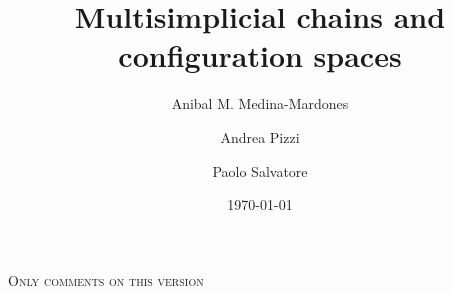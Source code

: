 \documentclass{amsart}
\title[Multisimplicial chains and configuration spaces]{Multisimplicial chains and configuration spaces}
\author[Medina-Mardones]{Anibal M. Medina-Mardones}
\author[Pizzi]{Andrea Pizzi}
\author[Salvatore]{Paolo Salvatore}
\date{\today}
\begin{document}
	\begin{center}
		\textsc{Only comments on this version}
	\end{center}
	
	\maketitle
	
	
	
	
	
	\sloppy
	\printbibliography
	\todos
\end{document}
